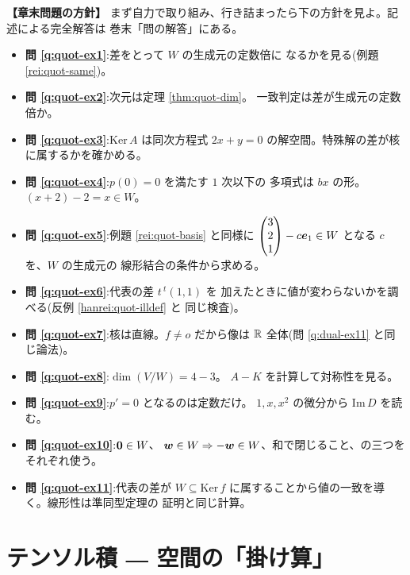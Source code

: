 \bigskip
{\small
\noindent\textbf{【章末問題の方針】}\quad
まず自力で取り組み、行き詰まったら下の方針を見よ。記述による完全解答は
巻末「問の解答」にある。
\begin{itemize}
\item \textbf{問 \ref{q:quot-ex1}}:差をとって $W$ の生成元の定数倍に
なるかを見る(例題 \ref{rei:quot-same})。
\item \textbf{問 \ref{q:quot-ex2}}:次元は定理 \ref{thm:quot-dim}。
一致判定は差が生成元の定数倍か。
\item \textbf{問 \ref{q:quot-ex3}}:$\mathrm{Ker}\,A$ は同次方程式
$2x + y = 0$ の解空間。特殊解の差が核に属するかを確かめる。
\item \textbf{問 \ref{q:quot-ex4}}:$p(0) = 0$ を満たす $1$ 次以下の
多項式は $bx$ の形。$(x + 2) - 2 = x \in W$。
\item \textbf{問 \ref{q:quot-ex5}}:例題 \ref{rei:quot-basis} と同様に
$\begin{pmatrix}3 \\ 2 \\ 1\end{pmatrix} - c\bm{e}_1 \in W$ となる $c$ を、$W$ の生成元の
線形結合の条件から求める。
\item \textbf{問 \ref{q:quot-ex6}}:代表の差 $t\,{}^t(1,1)$ を
加えたときに値が変わらないかを調べる(反例 \ref{hanrei:quot-illdef} と
同じ検査)。
\item \textbf{問 \ref{q:quot-ex7}}:核は直線。$f \neq o$ だから像は
$\mathbb{R}$ 全体(問 \ref{q:dual-ex11} と同じ論法)。
\item \textbf{問 \ref{q:quot-ex8}}:$\dim(V/W) = 4 - 3$。
$A - K$ を計算して対称性を見る。
\item \textbf{問 \ref{q:quot-ex9}}:$p' = 0$ となるのは定数だけ。
$1, x, x^2$ の微分から $\mathrm{Im}\,D$ を読む。
\item \textbf{問 \ref{q:quot-ex10}}:$\bm{0} \in W$、
$\bm{w} \in W \Rightarrow -\bm{w} \in W$、和で閉じること、の三つを
それぞれ使う。
\item \textbf{問 \ref{q:quot-ex11}}:代表の差が $W \subseteq
\mathrm{Ker}\,f$ に属することから値の一致を導く。線形性は準同型定理の
証明と同じ計算。
\end{itemize}
}

\chapter{テンソル積 ― 空間の「掛け算」}\label{chap:tensor}

